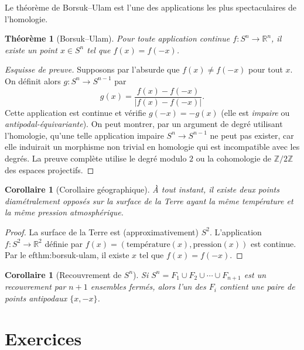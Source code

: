 \documentclass[12pt,a4paper,openany]{book}
\theoremstyle{definition}
\theoremstyle{plain}
\newtheorem{theoreme}[definition]{Théorème}
\newtheorem{corollaire}[definition]{Corollaire}
\theoremstyle{remark}
\newcommand{\Z}{\mathbb{Z}}
\newcommand{\R}{\mathbb{R}}
\newcommand{\abs}[1]{\left|#1\right|}
\begin{document}
Le théorème de Borsuk--Ulam est l'une des applications les plus spectaculaires de l'homologie.

\begin{theoreme}[Borsuk--Ulam]\label{thm:borsuk-ulam}
Pour toute application continue $f \colon S^n \to \R^n$, il existe un point $x \in S^n$
tel que $f(x) = f(-x)$.
\end{theoreme}

\begin{proof}[Esquisse de preuve]
Supposons par l'absurde que $f(x) \neq f(-x)$ pour tout $x$. On définit alors
$g \colon S^n \to S^{n-1}$ par
\[
  g(x) = \frac{f(x) - f(-x)}{\abs{f(x) - f(-x)}}.
\]
Cette application est continue et vérifie $g(-x) = -g(x)$ (elle est \emph{impaire} ou
\emph{antipodal-équivariante}). On peut montrer, par un argument de degré utilisant
l'homologie, qu'une telle application impaire $S^n \to S^{n-1}$ ne peut pas exister,
car elle induirait un morphisme non trivial en homologie qui est incompatible
avec les degrés. La preuve complète utilise le degré modulo $2$ ou la cohomologie
de $\Z/2\Z$ des espaces projectifs.
\end{proof}

\begin{corollaire}[Corollaire géographique]\label{cor:borsuk-ulam-geo}
À tout instant, il existe deux points diamétralement opposés sur la surface de la Terre
ayant la même température et la même pression atmosphérique.
\end{corollaire}

\begin{proof}
La surface de la Terre est (approximativement) $S^2$. L'application
$f \colon S^2 \to \R^2$ définie par $f(x) = (\text{température}(x), \text{pression}(x))$
est continue. Par le 
ef{thm:borsuk-ulam}, il existe $x$ tel que $f(x) = f(-x)$.
\end{proof}

\begin{corollaire}[Recouvrement de $S^n$]\label{cor:lusternik-schnirelmann}
Si $S^n = F_1 \cup F_2 \cup \cdots \cup F_{n+1}$ est un recouvrement par $n+1$ ensembles
fermés, alors l'un des $F_i$ contient une paire de points antipodaux $\{x, -x\}$.
\end{corollaire}

\section{Exercices}\label{sec:exo-ch6}
\end{document}
